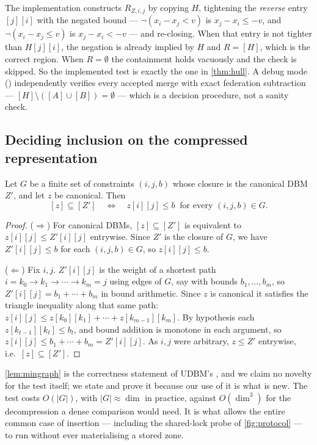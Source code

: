 \begin{remark}
The implementation constructs $R_{Z,i,j}$ by copying $H$, tightening the
\emph{reverse} entry $[j][i]$ with the negated bound --- $\neg(x_i - x_j < v)$
is $x_j - x_i \le -v$, and $\neg(x_i - x_j \le v)$ is $x_j - x_i < -v$ --- and
re-closing.  When that entry is not tighter than $H[j][i]$, the negation is
already implied by $H$ and $R = [H]$, which is the correct region.  When
$R = \emptyset$ the containment holds vacuously and the check is skipped.  So
the implemented test is exactly the one in \cref{thm:hull}.  A debug mode
() independently verifies every accepted merge with
exact federation subtraction --- $[H] \setminus ([A]\cup[B]) = \emptyset$ ---
which is a decision procedure, not a sanity check.
\end{remark}

\subsection{Deciding inclusion on the compressed representation}

\begin{lemma}\label{lem:mingraph}
Let $G$ be a finite set of constraints $(i,j,b)$ whose closure is the canonical
DBM $Z'$, and let $z$ be canonical.  Then
\[
  [z] \subseteq [Z'] \quad\iff\quad z[i][j] \le b \ \text{ for every } (i,j,b) \in G .
\]
\end{lemma}

\begin{proof}
($\Rightarrow$) For canonical DBMs, $[z] \subseteq [Z']$ is equivalent to
$z[i][j] \le Z'[i][j]$ entrywise.  Since $Z'$ is the closure of $G$, we have
$Z'[i][j] \le b$ for each $(i,j,b) \in G$, so $z[i][j] \le b$.

($\Leftarrow$) Fix $i,j$.  $Z'[i][j]$ is the weight of a shortest path
$i = k_0 \to k_1 \to \cdots \to k_m = j$ using edges of $G$, say with bounds
$b_1,\dots,b_m$, so $Z'[i][j] = b_1 + \cdots + b_m$ in bound arithmetic.  Since
$z$ is canonical it satisfies the triangle inequality along that same path:
$z[i][j] \le z[k_0][k_1] + \cdots + z[k_{m-1}][k_m]$.  By hypothesis each
$z[k_{t-1}][k_t] \le b_t$, and bound addition is monotone in each argument, so
$z[i][j] \le b_1 + \cdots + b_m = Z'[i][j]$.  As $i,j$ were arbitrary,
$z \le Z'$ entrywise, i.e.\ $[z] \subseteq [Z']$.
\end{proof}

\begin{remark}
\cref{lem:mingraph} is the correctness statement of UDBM's
, and we claim no novelty for the test itself; we
state and prove it because our use of it is what is new.  The test costs
$O(|G|)$, with $|G| \approx \dim$ in practice, against $O(\dim^3)$ for the
decompression a dense comparison would need.  It is what allows the entire
common case of insertion --- including the shared-lock probe of
\cref{fig:protocol} --- to run without ever materialising a stored zone.
\end{remark}

